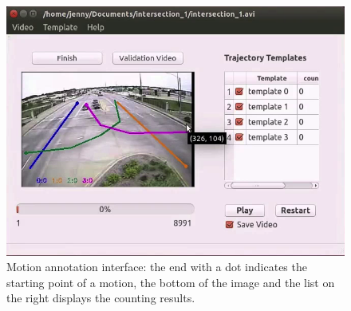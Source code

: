 \begin{figure}
\centering
\includegraphics[width=\linewidth]{./img/system/line_seg.png}
\caption{Motion annotation interface: the end with a dot indicates the starting point of a motion, the bottom of the image and the list on the right displays the counting results.}
\label{fig:anno-gui}
\end{figure}